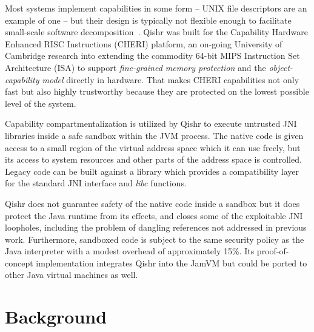 \documentclass[a4paper,12pt,twoside,openright]{report}
\newcommand{\tool}[1]{\emph{#1}}
\newcommand{\lib}[1]{\tool{lib#1}}
\begin{document}
Most systems implement capabilities in some form -- UNIX file descriptors are an example of one -- but their design is typically not flexible enough to facilitate small-scale software decomposition~\cite{Watson:2010:CPC:1929820.1929824}. Qishr was built for the Capability Hardware Enhanced RISC Instructions (CHERI) platform, an on-going University of Cambridge research into extending the commodity 64-bit MIPS Instruction Set Architecture (ISA) to support \emph{fine-grained memory protection} and the \emph{object-capability model} directly in hardware. That makes CHERI capabilities not only fast but also highly trustworthy because they are protected on the lowest possible level of the system.
 
Capability compartmentalization is utilized by Qishr to execute untrusted JNI libraries inside a safe sandbox within the JVM process. The native code is given access to a small region of the virtual address space which it can use freely, but its access to system resources and other parts of the address space is controlled. Legacy code can be built against a library which provides a compatibility layer for the standard JNI interface and \lib{c} functions.

Qishr does not guarantee safety of the native code inside a sandbox but it does protect the Java runtime from its effects, and closes some of the exploitable JNI loopholes, including the problem of dangling references not addressed in previous work. Furthermore, sandboxed code is subject to the same security policy as the Java interpreter with a modest overhead of approximately 15\%. Its proof-of-concept implementation integrates Qishr into the JamVM but could be ported to other Java virtual machines as well.

\chapter{Background} 

% 
\end{document}
